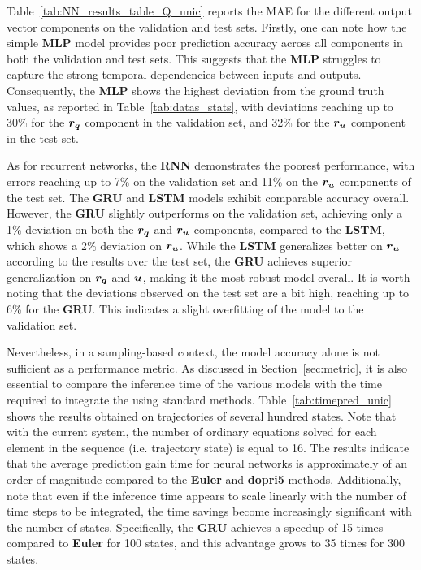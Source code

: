 Table~\ref{tab:NN_results_table_Q_unic} reports the MAE for the different output vector components on the validation and test sets. 
Firstly, one can note how the simple \textbf{MLP} model provides poor prediction accuracy across all components in both the validation and test sets.
This suggests that the \textbf{MLP} struggles to capture the strong temporal dependencies between inputs and outputs.
Consequently, the \textbf{MLP} shows the highest deviation from the ground truth values, as reported in Table~\ref{tab:datas_stats}, with deviations reaching up to 30\% for the $\boldsymbol{r_q}$ component in the validation set, and 32\% for the $\boldsymbol{r_u}$ component in the test set.

As for recurrent networks, the \textbf{RNN} demonstrates the poorest performance, with errors reaching up to 7\% on the validation set and 11\% on the $\boldsymbol{r_u}$ components of the test set.
The \textbf{GRU} and \textbf{LSTM} models exhibit comparable accuracy overall. 
However, the \textbf{GRU} slightly outperforms on the validation set, achieving only a 1\% deviation on both the $\boldsymbol{r_q}$ and $\boldsymbol{r_u}$ components, compared to the \textbf{LSTM}, which shows a 2\% deviation on $\boldsymbol{r_u}$.
While the \textbf{LSTM} generalizes better on $\boldsymbol{r_u}$ according to the results over the test set, the \textbf{GRU} achieves superior generalization on $\boldsymbol{r_q}$ and $\boldsymbol{u}$, making it the most robust model overall.
It is worth noting that the deviations observed on the test set are a bit high, reaching up to 6\% for the \textbf{GRU}. 
This indicates a slight overfitting of the model to the validation set.

Nevertheless, in a sampling-based context, the model accuracy alone is not sufficient as a performance metric.
As discussed in Section~\ref{sec:metric}, it is also essential to compare the inference time of the various models with the time required to integrate the  using standard methods.
Table~\ref{tab:timepred_unic} shows the results obtained on trajectories of several hundred states. 
Note that with the current system, the number of ordinary equations solved for each element in the sequence (i.e. trajectory state) is equal to 16.
The results indicate that the average prediction gain time for neural networks is approximately of an order of magnitude compared to the \textbf{Euler} and \textbf{dopri5} methods. 
Additionally, note that even if the inference time appears to scale linearly with the number of time steps to be integrated, the time savings become increasingly significant with the number of states. 
Specifically, the \textbf{GRU} achieves a speedup of 15 times compared to \textbf{Euler} for 100 states, and this advantage grows to 35 times for 300 states.

